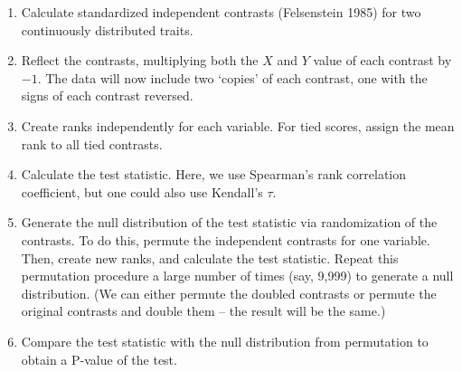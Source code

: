 \documentclass[fleqn,10pt,lineno]{wlpeerj} %
\begin{document}
\begin{enumerate}
\def\labelenumi{\arabic{enumi}.}
\item
  Calculate standardized independent contrasts (Felsenstein 1985) for two continuously distributed traits.
\item
  Reflect the contrasts, multiplying both the \(X\) and \(Y\) value of each contrast by \(-1\). The data will now include two `copies' of each contrast, one with the signs of each contrast reversed.
\item
  Create ranks independently for each variable. For tied scores, assign the mean rank to all tied contrasts.
\item
  Calculate the test statistic. Here, we use Spearman's rank correlation coefficient, but one could also use Kendall's \(\tau\).
\item
  Generate the null distribution of the test statistic via randomization of the contrasts. To do this, permute the independent contrasts for one variable. Then, create new ranks, and calculate the test statistic. Repeat this permutation procedure a large number of times (say, 9,999) to generate a null distribution. (We can either permute the doubled contrasts or permute the original contrasts and double them -- the result will be the same.)
\item
  Compare the test statistic with the null distribution from permutation to obtain a P-value of the test.
\end{enumerate}
\end{document}
